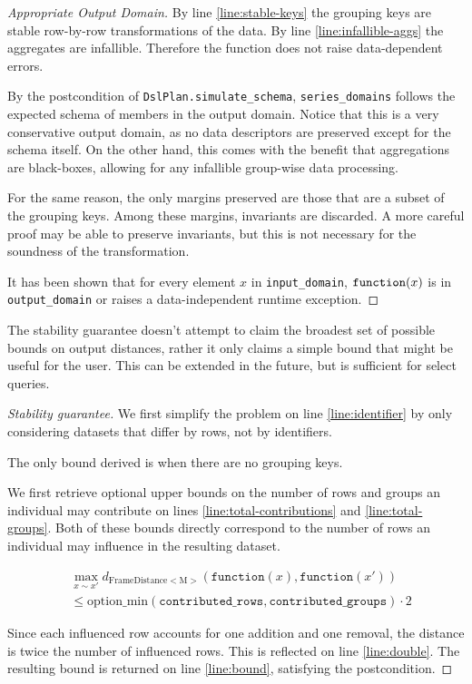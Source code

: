 \documentclass{article}
\begin{document}
\begin{proof}[Appropriate Output Domain]
    By line \ref{line:stable-keys} the grouping keys are stable row-by-row transformations of the data.
    By line \ref{line:infallible-aggs} the aggregates are infallible.
    Therefore the function does not raise data-dependent errors.

    By the postcondition of \texttt{DslPlan.simulate\_schema},
    \texttt{series\_domains} follows the expected schema of members in the output domain.
    Notice that this is a very conservative output domain, as no data descriptors are preserved except for the schema itself.
    On the other hand, this comes with the benefit that aggregations are black-boxes, allowing for any infallible group-wise data processing.

    For the same reason, the only margins preserved are those that are a subset of the grouping keys.
    Among these margins, invariants are discarded. A more careful proof may be able to preserve invariants,
    but this is not necessary for the soundness of the transformation.

    It has been shown that for every element $x$ in \texttt{input\_domain}, $\texttt{function}(x)$ is in \texttt{output\_domain} or raises a data-independent runtime exception.
\end{proof}


The stability guarantee doesn't attempt to claim the broadest set of possible bounds on output distances,
rather it only claims a simple bound that might be useful for the user.
This can be extended in the future, but is sufficient for select queries.

\begin{proof}[Stability guarantee]
    We first simplify the problem on line \ref{line:identifier} by only considering datasets that differ by rows, not by identifiers.
    
    The only bound derived is when there are no grouping keys.

    We first retrieve optional upper bounds on the number of rows and groups an individual may contribute on lines \ref{line:total-contributions} and \ref{line:total-groups}.
    Both of these bounds directly correspond to the number of rows an individual may influence in the resulting dataset.
    
    \begin{align}
        &\max_{x \sim x'} d_{\mathrm{FrameDistance<M>}}(\texttt{function}(x), \texttt{function}(x')) \\
        &\le \mathrm{option\_min}(\texttt{contributed\_rows}, \texttt{contributed\_groups}) \cdot 2
    \end{align}

    Since each influenced row accounts for one addition and one removal, the distance is twice the number of influenced rows.
    This is reflected on line \ref{line:double}.
    The resulting bound is returned on line \ref{line:bound}, satisfying the postcondition.
\end{proof}
\end{document}
